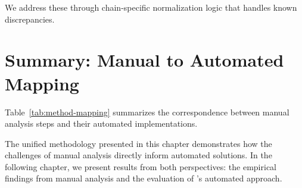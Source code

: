 We address these through chain-specific normalization logic that handles known discrepancies.

\section{Summary: Manual to Automated Mapping}
\label{sec:meth-summary}

Table~\ref{tab:method-mapping} summarizes the correspondence between manual analysis steps and their automated implementations.



The unified methodology presented in this chapter demonstrates how the challenges of manual analysis directly inform automated solutions. In the following chapter, we present results from both perspectives: the empirical findings from manual analysis and the evaluation of \ToolName's automated approach.

